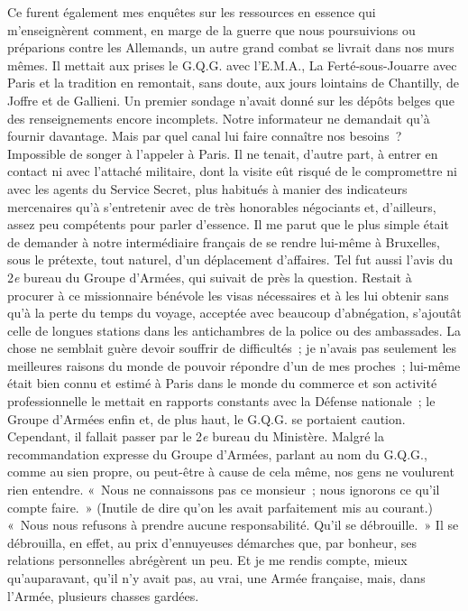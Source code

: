 \documentclass[french,twoside]{book} %
\begin{document}
Ce furent également mes enquêtes sur les ressources en essence qui m’enseignèrent comment, en marge de la guerre que nous poursuivions ou préparions contre les Allemands, un autre grand combat se livrait dans nos murs mêmes. Il mettait aux prises le G.Q.G. avec l’E.M.A., La Ferté-sous-Jouarre avec Paris et la tradition en remontait, sans doute, aux jours lointains de Chantilly, de Joffre et de Gallieni. Un premier sondage n’avait donné sur les dépôts belges que des renseignements encore incomplets. Notre informateur ne demandait qu’à fournir davantage. Mais par quel canal lui faire connaître nos besoins ? Impossible de songer à l’appeler à Paris. Il ne tenait, d’autre part, à entrer en contact ni avec l’attaché militaire, dont la visite eût risqué de le compromettre ni avec les agents du Service Secret, plus habitués à manier des indicateurs mercenaires qu’à s’entretenir avec de très honorables négociants et, d’ailleurs, assez peu compétents pour parler d’essence. Il me parut que le plus simple était de demander à notre intermédiaire français de se rendre lui-même à Bruxelles, sous le prétexte, tout naturel, d’un déplacement d’affaires. Tel fut aussi l’avis du 2\emph{e} bureau du Groupe d’Armées, qui suivait de près la question. Restait à procurer à ce missionnaire bénévole les visas nécessaires et à les lui   obtenir sans qu’à la perte du temps du voyage, acceptée avec beaucoup d’abnégation, s’ajoutât celle de longues stations dans les antichambres de la police ou des ambassades. La chose ne semblait guère devoir souffrir de difficultés ; je n’avais pas seulement les meilleures raisons du monde de pouvoir répondre d’un de mes proches ; lui-même était bien connu et estimé à Paris dans le monde du commerce et son activité professionnelle le mettait en rapports constants avec la Défense nationale ; le Groupe d’Armées enfin et, de plus haut, le G.Q.G. se portaient caution. Cependant, il fallait passer par le 2\emph{e} bureau du Ministère. Malgré la recommandation expresse du Groupe d’Armées, parlant au nom du G.Q.G., comme au sien propre, ou peut-être à cause de cela même, nos gens ne voulurent rien entendre. « Nous ne connaissons pas ce monsieur ; nous ignorons ce qu’il compte faire. » (Inutile de dire qu’on les avait parfaitement mis au courant.) « Nous nous refusons à prendre aucune responsabilité. Qu’il se débrouille. » Il se débrouilla, en effet, au prix d’ennuyeuses démarches que, par bonheur, ses relations personnelles abrégèrent un peu. Et je me rendis compte, mieux qu’auparavant, qu’il n’y avait pas, au vrai, une Armée française, mais, dans l’Armée, plusieurs chasses gardées.\par
\end{document}
